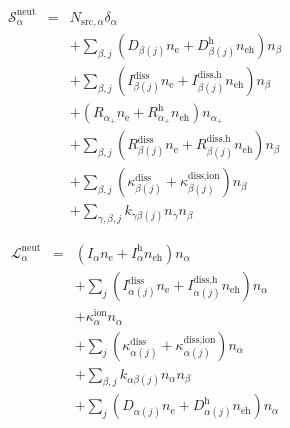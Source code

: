 \documentclass[12pt, letterpaper]{article}
\begin{document}
\begin{eqnarray}
\mathcal{S}^{\text{neut}}_{\alpha} & = & N_{\text{src},\alpha} \delta_{\alpha} \nonumber \\
& & + \sum_{\beta,j} \left( D_{\beta \left( j \right)} n_{\text{e}} + D^{\text{h}}_{\beta \left( j \right)} n_{\text{eh}} \right) n_{\beta} \nonumber \\
& & + \sum_{\beta,j} \left( I^{\text{diss}}_{\beta \left( j \right)} n_{\text{e}} + I^{\text{diss,h}}_{\beta \left( j \right)} n_{\text{eh}} \right) n_{\beta} \nonumber \\
& & + \left( R_{\alpha_{+}} n_{\text{e}} + R_{\alpha_{+}}^{\text{h}} n_{\text{eh}} \right) n_{\alpha_{+}} \nonumber \\
& & + \sum_{\beta,j} \left( R^{\text{diss}}_{\beta \left( j \right)} n_{\text{e}} + R^{\text{diss,h}}_{\beta \left( j \right)} n_{\text{eh}} \right) n_{\beta} \nonumber \\
& & + \sum_{\beta,j} \left( \kappa^{\text{diss}}_{\beta \left( j \right)} + \kappa^{\text{diss,ion}}_{\beta \left( j \right)} \right) n_{\beta} \nonumber \\
& & + \sum_{\gamma, \beta, j} k_{\gamma \beta \left( j \right)} n_{\gamma} n_{\beta}
\end{eqnarray}

\begin{eqnarray}
\mathcal{L}^{\text{neut}}_{\alpha} & = & \left( I_{\alpha} n_{\text{e}} + I^{\text{h}}_{\alpha} n_{\text{eh}} \right) n_{\alpha} \nonumber \\
& & + \sum_{j} \left( I^{\text{diss}}_{\alpha \left( j \right)} n_{\text{e}} + I^{\text{diss,h}}_{\alpha \left( j \right)} n_{\text{eh}} \right) n_{\alpha} \nonumber \\
& & + \kappa^{\text{ion}}_{\alpha} n_{\alpha} \nonumber \\
& & + \sum_{j} \left( \kappa^{\text{diss}}_{\alpha \left( j \right)} + \kappa^{\text{diss,ion}}_{\alpha \left( j \right)} \right) n_{\alpha} \nonumber \\
& & + \sum_{\beta,j} k_{\alpha \beta \left( j \right)} n_{\alpha} n_{\beta} \nonumber \\
& & + \sum_{j} \left( D_{\alpha \left( j \right)} n_{\text{e}} + D^{\text{h}}_{\alpha \left( j \right)} n_{\text{eh}} \right) n_{\alpha}
\end{eqnarray}
\end{document}
